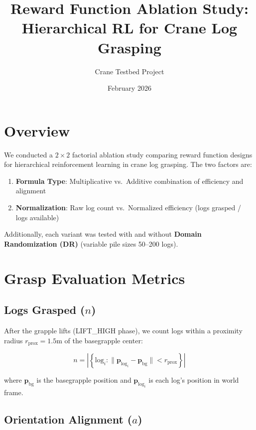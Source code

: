 \documentclass[11pt]{article}
\title{Reward Function Ablation Study:\\Hierarchical RL for Crane Log Grasping}
\author{Crane Testbed Project}
\date{February 2026}
\begin{document}
\maketitle

\section{Overview}

We conducted a $2 \times 2$ factorial ablation study comparing reward function designs for hierarchical reinforcement learning in crane log grasping. The two factors are:

\begin{enumerate}
    \item \textbf{Formula Type}: Multiplicative vs.\ Additive combination of efficiency and alignment
    \item \textbf{Normalization}: Raw log count vs.\ Normalized efficiency (logs grasped / logs available)
\end{enumerate}

Additionally, each variant was tested with and without \textbf{Domain Randomization (DR)} (variable pile sizes 50--200 logs).

\section{Grasp Evaluation Metrics}

\subsection{Logs Grasped ($n$)}

After the grapple lifts (LIFT\_HIGH phase), we count logs within a proximity radius $r_{\text{prox}} = 1.5\text{m}$ of the basegrapple center:

\begin{equation}
    n = \left| \left\{ \text{log}_i : \| \mathbf{p}_{\text{log}_i} - \mathbf{p}_{\text{bg}} \| < r_{\text{prox}} \right\} \right|
\end{equation}

where $\mathbf{p}_{\text{bg}}$ is the basegrapple position and $\mathbf{p}_{\text{log}_i}$ is each log's position in world frame.

\subsection{Orientation Alignment ($a$)}
\end{document}
